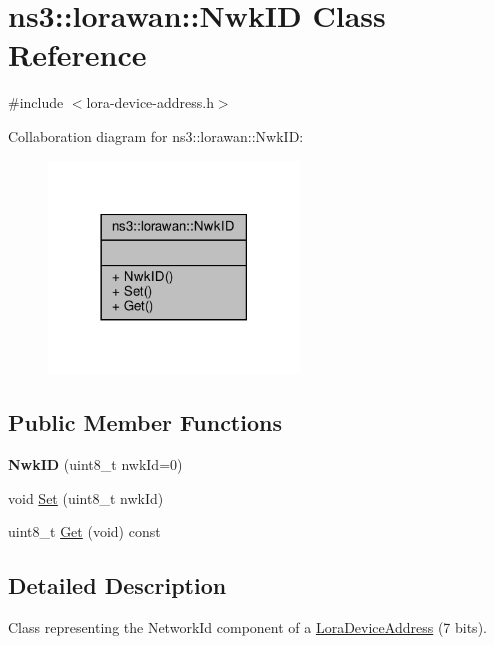 \hypertarget{classns3_1_1lorawan_1_1NwkID}{}\section{ns3\+:\+:lorawan\+:\+:Nwk\+ID Class Reference}
\label{classns3_1_1lorawan_1_1NwkID}


{\ttfamily \#include $<$lora-\/device-\/address.\+h$>$}



Collaboration diagram for ns3\+:\+:lorawan\+:\+:Nwk\+ID\+:
\nopagebreak
\begin{figure}[H]
\begin{center}
\leavevmode
\includegraphics[width=189pt]{classns3_1_1lorawan_1_1NwkID__coll__graph}
\end{center}
\end{figure}
\subsection*{Public Member Functions}
\begin{DoxyCompactItemize}
\item 
\mbox{\label{classns3_1_1lorawan_1_1NwkID_a6304d661bc80d590d700e930f39ecb8a}} 
{\bfseries Nwk\+ID} (uint8\+\_\+t nwk\+Id=0)
\item 
void \hyperlink{classns3_1_1lorawan_1_1NwkID_af1ec442f10512a4666e766bcd2e924eb}{Set} (uint8\+\_\+t nwk\+Id)
\item 
uint8\+\_\+t \hyperlink{classns3_1_1lorawan_1_1NwkID_a3a80ac6b751d3a3df4ff4b2548ad8933}{Get} (void) const
\end{DoxyCompactItemize}


\subsection{Detailed Description}
Class representing the Network\+Id component of a \hyperlink{classns3_1_1lorawan_1_1LoraDeviceAddress}{Lora\+Device\+Address} (7 bits). 

